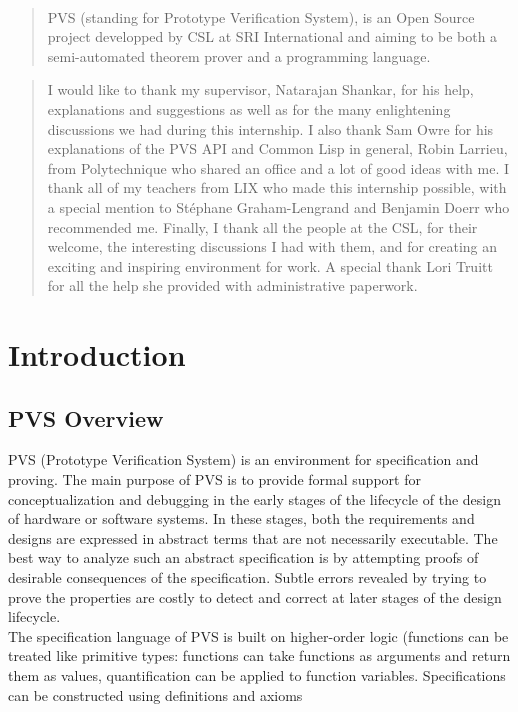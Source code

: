 \documentclass[12pt,a4paper]{article}
\begin{document}


\newpage
\
\vspace{2in}
\begin{abstract}
PVS (standing for Prototype Verification System), is an Open Source project developped by CSL at SRI International and aiming to be both a semi-automated theorem prover and a programming language. 
\end{abstract}

\vspace{1in}
\renewcommand{\abstractname}{Acknowledgements}
\begin{abstract}
I would like to thank my supervisor, Natarajan Shankar, for his help, explanations and suggestions as well as for the many enlightening discussions we had during this internship. I also thank Sam Owre for his explanations of the PVS API and Common Lisp in general, Robin Larrieu, from Polytechnique who shared an office and a lot of good ideas with me. I thank all of my teachers from  LIX who made this internship possible, with a special mention to Stéphane Graham-Lengrand and Benjamin Doerr who recommended me.
Finally, I thank all the people at the CSL, for their welcome, the interesting discussions I had with them, and for creating an exciting and inspiring environment for work. 
A special thank Lori Truitt for all the help she provided with administrative paperwork.
\end{abstract}


\newpage
\tableofcontents
\newpage

\section{Introduction}


\subsection{PVS Overview}

PVS  (Prototype Verification System) is an environment for specification and proving. The main purpose of PVS is to provide 
formal support for conceptualization and debugging in the early stages of the lifecycle of the design
of hardware or software systems. In these stages, both the requirements and designs are expressed in abstract
terms that are not necessarily executable. The best way to analyze such an abstract specification is by 
attempting proofs of desirable consequences of the specification. Subtle errors revealed by trying to prove
the properties are costly to detect and correct at later stages of the design lifecycle.
\\The specification language of PVS is built on higher-order logic (functions can be treated like
primitive types: functions can take functions as arguments and return them as values, quantification
can be applied to function variables. Specifications can be constructed using definitions and axioms
\end{document}
